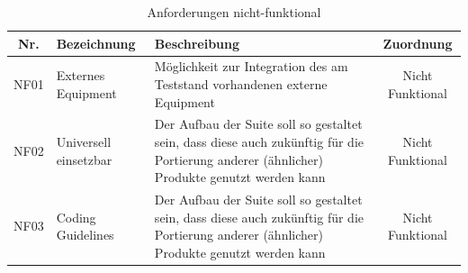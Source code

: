 \begin{table}[h]

\begin{center}

\begin{tabularx}{\textwidth}{|c|X|X|c|}

\hline
Nr. & Bezeichnung & Beschreibung & Zuordnung \\
\hline
NF01 & Externes Equipment & Möglichkeit zur Integration des am Teststand vorhandenen externe Equipment & Nicht Funktional \\
\hline
NF02 & Universell einsetzbar & Der Aufbau der Suite soll so gestaltet sein, dass diese auch zukünftig für die Portierung anderer (ähnlicher) Produkte genutzt werden kann & Nicht Funktional \\
\hline
NF03 & Coding Guidelines & Der Aufbau der Suite soll so gestaltet sein, dass diese auch zukünftig für die Portierung anderer (ähnlicher) Produkte genutzt werden kann & Nicht Funktional \\
\hline


\end{tabularx}
\caption{Anforderungen nicht-funktional \label{tab:Anforderungstabelle2}}
\end{center}
\end{table}
\cleardoublepage



